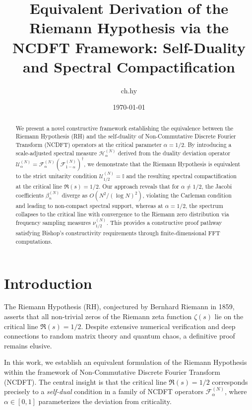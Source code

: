 \documentclass[12pt,a4paper]{amsart}
\title[NCDFT and the Riemann Hypothesis]{Equivalent Derivation of the Riemann Hypothesis via the NCDFT Framework: Self-Duality and Spectral Compactification}
\author{ch.hy}
\date{\today}
\theoremstyle{plain}
\theoremstyle{definition}
\theoremstyle{remark}
\begin{document}
\begin{abstract}
We present a novel constructive framework establishing the equivalence between the Riemann Hypothesis (RH) and the self-duality of Non-Commutative Discrete Fourier Transform (NCDFT) operators at the critical parameter $\alpha = 1/2$. By introducing a scale-adjusted spectral measure $\mathcal{H}_\alpha^{(N)}$ derived from the duality deviation operator $\mathcal{U}_\alpha^{(N)} = \mathcal{F}_\alpha^{(N)}(\mathcal{F}_{1-\alpha}^{(N)})^\dagger$, we demonstrate that the Riemann Hypothesis is equivalent to the strict unitarity condition $\mathcal{U}_{1/2}^{(N)} = \mathbb{I}$ and the resulting spectral compactification at the critical line $\Re(s) = 1/2$. Our approach reveals that for $\alpha \neq 1/2$, the Jacobi coefficients $\beta_n^{(N)}$ diverge as $O(N^2/(\log N)^2)$, violating the Carleman condition and leading to non-compact spectral support, whereas at $\alpha = 1/2$, the spectrum collapses to the critical line with convergence to the Riemann zero distribution via frequency sampling measures $\nu_{1/2}^{(N)}$. This provides a constructive proof pathway satisfying Bishop's constructivity requirements through finite-dimensional FFT computations.
\end{abstract}


\maketitle

\section{Introduction}

The Riemann Hypothesis (RH), conjectured by Bernhard Riemann in 1859, asserts that all non-trivial zeros of the Riemann zeta function $\zeta(s)$ lie on the critical line $\Re(s) = 1/2$. Despite extensive numerical verification and deep connections to random matrix theory and quantum chaos, a definitive proof remains elusive.

In this work, we establish an equivalent formulation of the Riemann Hypothesis within the framework of Non-Commutative Discrete Fourier Transform (NCDFT). The central insight is that the critical line $\Re(s) = 1/2$ corresponds precisely to a \emph{self-dual} condition in a family of NCDFT operators $\mathcal{F}_\alpha^{(N)}$, where $\alpha \in [0,1]$ parameterizes the deviation from criticality.
\end{document}
